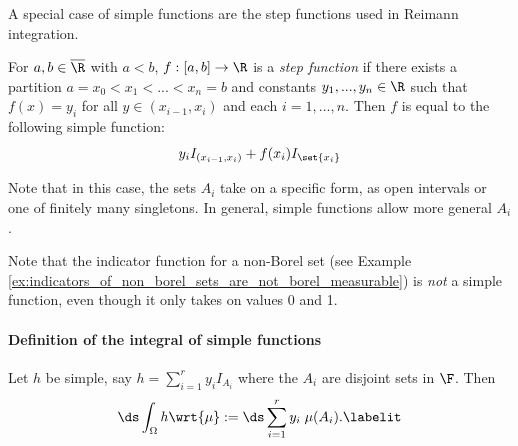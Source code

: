 \documentclass{article} %
\begin{document}
\begin{remark}{}
A special case of simple functions are the step functions used in Reimann integration. 


For $a,b \in \overline{\R}$ with $a<b$, $f : [a,b] \to \R$ is a \textit{step function} if there exists a partition $a = x_0 < x_1 < ... < x_n = b$ and constants $y_1, ..., y_n \in \R$ such that $f(x)=y_i$ for all $y \in (x_{i-1},x_i)$ and each $i=1,...,n$.  Then $f$ is equal to the following simple function:
\[ y_i I_{(x_{i-1}, x_i)} + f(x_i) I_{\set{x_i}}\]

Note that in this case, the sets $A_i$ take on a specific form, as open intervals or one of finitely many singletons.  In general, simple functions allow more general $A_i$. 

\label{rk:simple_functions_generalize_step_functions}
\end{remark}

\begin{remark}
Note that the indicator function for a non-Borel set (see Example \ref{ex:indicators_of_non_borel_sets_are_not_borel_measurable}) is \textit{not} a simple function, even though it only takes on values 0 and 1. 
\end{remark}

\paragraph{Definition of the integral of simple functions}

\begin{definition}
Let $h$ be simple, say $h = \sum_{i=1}^r y_i I_{A_i}$ where the $A_i$ are disjoint sets in $\F$.  Then
\begin{align*}
\ds\int_{\Omega} h \wrt{\mu} := \ds\sum_{i=1}^r y_i \; \mu(A_i).
\labelit \label{eqn:integral_of_simple_function}	
\end{align*}
 \label{def:integral_of_simple_function}
\end{definition}
\end{document}
